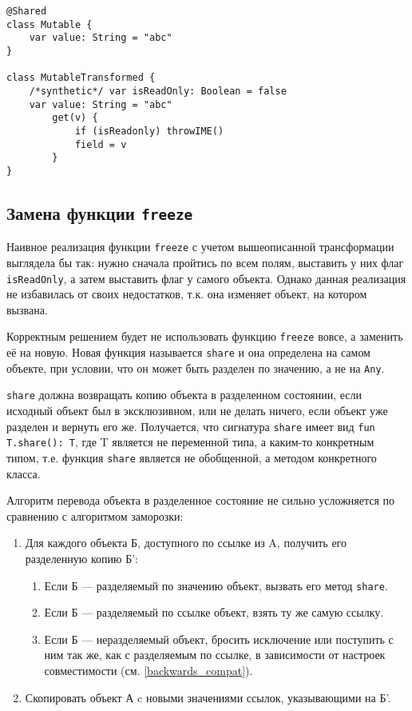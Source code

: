 \documentclass[specification,annotation,times]{itmo-student-thesis}
\begin{document}
\begin{lstlisting}[float=h!,caption={Код до и после трансформации}]
@Shared
class Mutable {
	var value: String = "abc"
}

class MutableTransformed {
	/*synthetic*/ var isReadOnly: Boolean = false
	var value: String = "abc"
		get(v) {
			if (isReadonly) throwIME() 
			field = v
		}
}
\end{lstlisting}

\subsection{Замена функции \texttt{freeze}}

Наивное реализация функции \texttt{freeze} с учетом вышеописанной трансформации выглядела бы так: нужно сначала пройтись по всем полям, выставить у них флаг \texttt{isReadOnly}, а затем выставить флаг у самого объекта.
Однако данная реализация не избавилась от своих недостатков, т.к. она изменяет объект, на котором вызвана.

Корректным решением будет не использовать функцию \texttt{freeze} вовсе, а заменить её на новую. Новая функция называется \texttt{share} и она определена на самом объекте, при условии, что он может быть разделен по значению, а не на \texttt{Any}.

\texttt{share} должна возвращать копию объекта в разделенном состоянии, если исходный объект был в эксклюзивном, или не делать ничего, если объект уже разделен и вернуть его же.
Получается, что сигнатура \texttt{share} имеет вид \texttt{fun T.share(): T}, где T является не переменной типа, а каким-то конкретным типом, т.е. функция \texttt{share} является не обобщенной, а методом конкретного класса.

Алгоритм перевода объекта в разделенное состояние не сильно усложняется по сравнению с алгоритмом заморозки:

\begin{enumerate}
	\item Для каждого объекта Б, доступного по ссылке из A, получить его разделенную копию Б':
	\begin{enumerate}
		\item Если Б --- разделяемый по значению объект, вызвать его метод \texttt{share}.
		\item Если Б --- разделяемый по ссылке объект, взять ту же самую ссылку.
		\item Если Б --- неразделяемый объект, бросить исключение или поступить с ним так же, как с разделяемым по ссылке, в зависимости от настроек совместимости (см. \ref{backwards_compat}).
	\end{enumerate}
	\item Скопировать объект А c новыми значениями ссылок, указывающими на Б'.
\end{enumerate}
\end{document}
